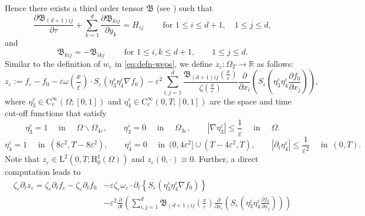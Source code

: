 \documentclass[preprint, 12pt]{amsart}
\numberwithin{equation}{section}
\numberwithin{equation}{section}
\newcommand{\xeps}{\left(\frac{x}{\varepsilon}\right)}
\newcommand\RR{\mathbb{R}}
\newcommand{\eps}{\varepsilon}
\begin{document}
Hence there exists a third order tensor $\mathfrak{B}$ (see \cite[Proposition 3.1.1, page 35]{shen2018periodic}) such that
\begin{equation}\label{eq:3rd-order-tensor}
\frac{\partial \mathfrak{B}_{(d+1)ij}}{\partial \tau} + \sum_{k=1}^d \frac{\partial \mathfrak{B}_{kij}}{\partial y_k} = H_{ij} \qquad \mbox{ for }1\le i\le d+1, \quad 1\le j\le d,
\end{equation}
and
\begin{equation}\label{eq:B-skewsym}
\mathfrak{B}_{kij} = -\mathfrak{B}_{ikj} \qquad \mbox{ for }1\le i,k\le d+1, \qquad 1\le j\le d.
\end{equation}
Similar to the definition of $w_\eps$ in \eqref{eq:defn-weps}, we define $z_\eps:\Omega_T\to\RR$ as follows:
\begin{equation}\label{eq:defn-zeps}
z_\eps := f_\eps - f_0 
- \eps \omega\left(\frac{x}{\eps}\right)\cdot S_\eps \left( \eta_3^\eps \eta_4^\eps \nabla f_0 \right)
- \eps^2 \sum_{i,j=1}^d \frac{\mathfrak{B}_{(d+1)ij}\xeps}{\zeta\xeps} \frac{\partial}{\partial x_i} \left(S_\eps \left( \eta_3^\eps \eta_4^\eps \frac{\partial f_0}{\partial x_j}\right)\right),
\end{equation}
where $\eta_3^\eps\in\mathrm{C}_c^{\infty}(\Omega;[0,1])$ and $\eta_4^\eps\in \mathrm{C}_c^\infty(0,T;[0,1])$ are the space and time cut-off functions that satisfy
\[
\eta_3^\eps = 1 \quad \mbox{ in }\quad \Omega \backslash \Omega_{4\varepsilon},
\qquad
\eta_3^\eps = 0 \quad \mbox{ in }\quad \Omega_{3\varepsilon},
\qquad
\left\vert\nabla \eta_3^\eps \right\vert \leq \frac{1}{\eps} \quad \mbox{ in }\quad \Omega.
\]
\[
\eta_4^\eps = 1 \quad \mbox{ in }\, \left(8\eps^2, T-8\eps^2\right),
\qquad
\eta_4^\eps = 0 \quad \mbox{ in }\, (0,4\eps^2]\cup(T-4\eps^2,T),
\qquad 
\left\vert \partial_t \eta_4^\eps\right\vert \leq \frac{1}{\eps^2} \quad \mbox{ in }\, (0,T).
\]
Note that $z_\eps\in\mathrm L^2(0,T;\mathrm H^1_0(\Omega))$ and $z_\eps(0,\cdot)\equiv0$. Further, a direct computation leads to
\begin{equation*}
\begin{aligned}
\zeta_\eps\partial_{t}z_{\varepsilon}
= \zeta_\eps \partial_t f_\eps 
- \zeta_\eps \partial_t f_0 
& - \eps \zeta_\eps \omega_\eps\cdot \partial_t \left\{S_\eps \left( \eta_3^\eps \eta_4^\eps \nabla f_0 \right)\right\}
\\ 
& - \eps^2 \frac{\partial}{\partial t} \left( \sum_{i,j=1}^d \mathfrak{B}_{(d+1)ij}\xeps \frac{\partial}{\partial x_i} \left(S_\eps \left( \eta_3^\eps \eta_4^\eps \frac{\partial f_0}{\partial x_j}\right)\right)\right)
\end{aligned}
\end{equation*}
\end{document}
